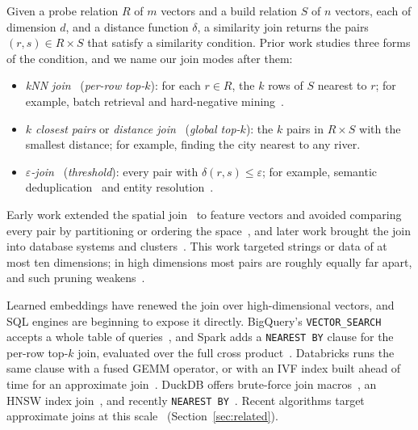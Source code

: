 Given a probe relation $R$ of $m$ vectors and a build relation $S$ of $n$ vectors, each of dimension $d$, and a distance function $\delta$, a similarity join returns the pairs $(r, s) \in R \times S$ that satisfy a similarity condition.
Prior work studies three forms of the condition, and we name our join modes after them:
\begin{itemize}
    \item \emph{kNN join}~\cite{BohmKrebsKNNJoin04} (\emph{per-row top-$k$}): for each $r \in R$, the $k$ rows of $S$ nearest to $r$; for example, batch retrieval and hard-negative mining~\cite{HuangFBRetrieval20, XiongANCE21}.
    \item \emph{$k$ closest pairs} or \emph{distance join}~\cite{HjaltasonSametDistJoin98, CorralClosestPair00} (\emph{global top-$k$}): the $k$ pairs in $R \times S$ with the smallest distance; for example, finding the city nearest to any river.
    \item \emph{$\varepsilon$-join}~\cite{ShimSimJoin97, KoudasSevcik98} (\emph{threshold}): every pair with $\delta(r, s) \le \varepsilon$; for example, semantic deduplication~\cite{AbbasSemDeDup23} and entity resolution~\cite{SantanaEMJoin25}.
\end{itemize}

Early work extended the spatial join~\cite{BrinkhoffSpatialJoin93} to feature vectors and avoided comparing every pair by partitioning or ordering the space~\cite{ShimSimJoin97, BohmEGO01, XiaGorder04}, and later work brought the join into database systems and clusters~\cite{ChaudhuriSSJoin06, ArasuDataCleaning11, SilvaSimJoinOp10, LuKNNMapReduce12, XieSimba16}.
This work targeted strings or data of at most ten dimensions; in high dimensions most pairs are roughly equally far apart, and such pruning weakens~\cite{BeyerNNMeaningful99}.

Learned embeddings have renewed the join over high-dimensional vectors, and SQL engines are beginning to expose it directly.
BigQuery's \texttt{VECTOR\_SEARCH} accepts a whole table of queries~\cite{BigQueryVectorSearchFn}, and Spark adds a \texttt{NEAREST BY} clause for the per-row top-$k$ join, evaluated over the full cross product~\cite{ApacheSparkJIRA56395, SparkNearestByJoin26}.
Databricks runs the same clause with a fused GEMM operator, or with an IVF index built ahead of time for an approximate join~\cite{DatabricksNearestByJoinBlog26}.
DuckDB offers brute-force join macros~\cite{DuckDBVSS}, an HNSW index join~\cite{DuckDBVSSBlog24}, and recently \texttt{NEAREST BY}~\cite{DuckDBNearestByPR24137}.
Recent algorithms target approximate joins at this scale~\cite{XieSimJoin25, ChenDiskJoin25, KimVectorJoin26} (Section~\ref{sec:related}).

